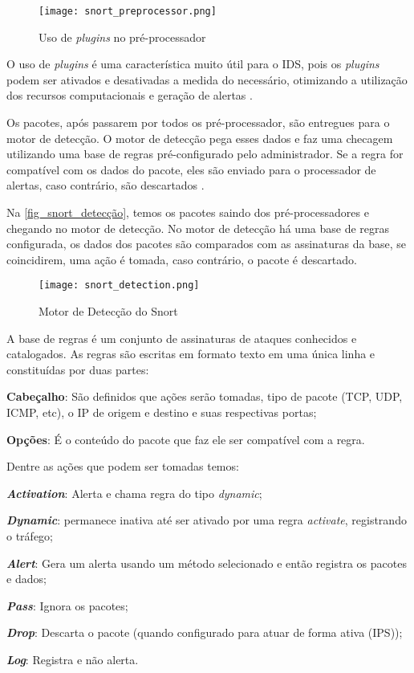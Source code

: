 \begin{figure}[htb]
  \centering
  \caption{Uso de \textit{plugins} no pré-processador} \label{fig_snort_preprocessor}
  \texttt{[image: snort\_preprocessor.png]}
\end{figure}

O uso de \textit{plugins} é uma característica muito útil para o IDS, pois os \textit{plugins} podem ser ativados e desativadas a medida do necessário, otimizando a utilização dos recursos computacionais e geração de alertas \cite{snort:andrew}.

Os pacotes, após passarem por todos os pré-processador, são entregues para o motor de detecção. O motor de detecção pega esses dados e faz uma checagem utilizando uma base de regras pré-configurado pelo administrador. Se a regra for compatível com os dados do pacote, eles são enviado para o processador de alertas, caso contrário, são descartados \cite{snort:andrew}.

Na \autoref{fig_snort_detecção}, temos os pacotes saindo dos pré-processadores e chegando no motor de detecção. No motor de detecção há uma base de regras configurada, os dados dos pacotes são comparados com as assinaturas da base, se coincidirem, uma ação é tomada, caso contrário, o pacote é descartado.

\begin{figure}[htb]
  \centering
  \caption{Motor de Detecção do Snort} \label{fig_snort_detecção}
  \texttt{[image: snort\_detection.png]}
\end{figure}

A base de regras é um conjunto de assinaturas de ataques conhecidos e catalogados. As regras são escritas em formato texto em uma única linha e constituídas por duas partes: 

\begin{alineas}
\item \textbf{Cabeçalho}: São definidos que ações serão tomadas, tipo de pacote (TCP, UDP, ICMP, etc), o IP de origem e destino e suas respectivas portas;
\item \textbf{Opções}: É o conteúdo do pacote que faz ele ser compatível com a regra.
\end{alineas}

Dentre as ações que podem ser tomadas temos:

\begin{alineas}
\item \textbf{\textit{Activation}}: Alerta e chama regra do tipo \textit{dynamic};
\item \textbf{\textit{Dynamic}}: permanece inativa até ser ativado por uma regra \textit{activate}, registrando o tráfego;
\item \textbf{\textit{Alert}}: Gera um alerta usando um método selecionado e então registra os pacotes e dados;
\item \textbf{\textit{Pass}}: Ignora os pacotes;
\item \textbf{\textit{Drop}}: Descarta o pacote (quando configurado para atuar de forma ativa (IPS)); 
\item \textbf{\textit{Log}}: Registra e não alerta.
\end{alineas}

